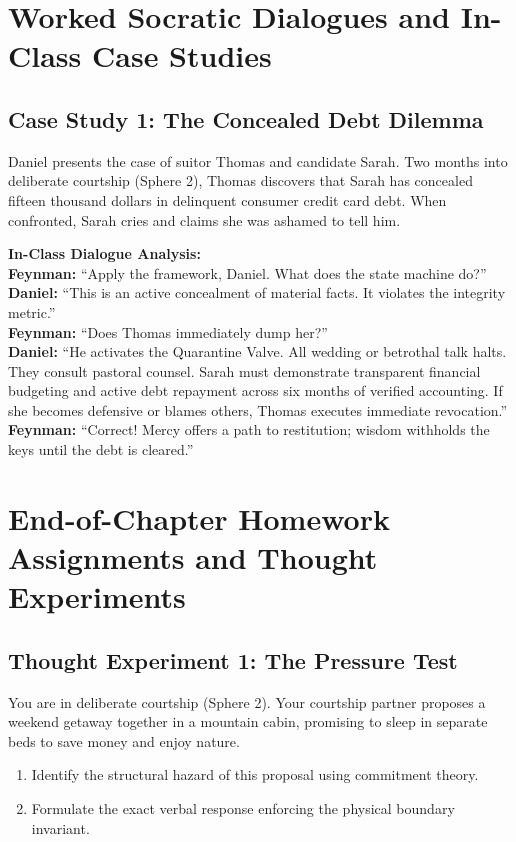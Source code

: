 \documentclass[11pt]{report}
\begin{document}
\chapter{Worked Socratic Dialogues and In-Class Case Studies}

\section{Case Study 1: The Concealed Debt Dilemma}
Daniel presents the case of suitor Thomas and candidate Sarah. Two months into deliberate courtship (Sphere 2), Thomas discovers that Sarah has concealed fifteen thousand dollars in delinquent consumer credit card debt. When confronted, Sarah cries and claims she was ashamed to tell him.

\begin{blackboard}
\textbf{In-Class Dialogue Analysis:}\\
\textbf{Feynman:} ``Apply the framework, Daniel. What does the state machine do?''\\
\textbf{Daniel:} ``This is an active concealment of material facts. It violates the integrity metric.''\\
\textbf{Feynman:} ``Does Thomas immediately dump her?''\\
\textbf{Daniel:} ``He activates the Quarantine Valve. All wedding or betrothal talk halts. They consult pastoral counsel. Sarah must demonstrate transparent financial budgeting and active debt repayment across six months of verified accounting. If she becomes defensive or blames others, Thomas executes immediate revocation.''\\
\textbf{Feynman:} ``Correct! Mercy offers a path to restitution; wisdom withholds the keys until the debt is cleared.''
\end{blackboard}

\chapter{End-of-Chapter Homework Assignments and Thought Experiments}

\section{Thought Experiment 1: The Pressure Test}
You are in deliberate courtship (Sphere 2). Your courtship partner proposes a weekend getaway together in a mountain cabin, promising to sleep in separate beds to save money and enjoy nature. 
\begin{enumerate}
    \item Identify the structural hazard of this proposal using commitment theory.
    \item Formulate the exact verbal response enforcing the physical boundary invariant.
\end{enumerate}
\end{document}

